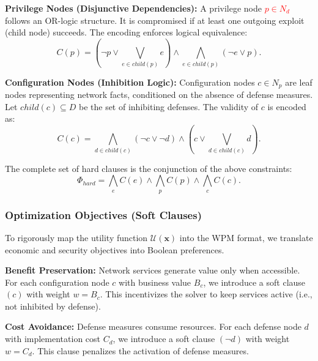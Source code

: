 \documentclass[conference]{IEEEtran}
\theoremstyle{definition} %
\theoremstyle{plain} %
\begin{document}
\textbf{Privilege Nodes (Disjunctive Dependencies):}
A privilege node \textcolor{red}{$p \in N_d$} follows an OR-logic structure. It is compromised if at least one outgoing exploit (child node) succeeds. The encoding enforces logical equivalence:
\begin{equation}
    \label{eq:hard_privilege}
    C(p) = \left( \neg p \vee \bigvee_{e \in child(p)} e \right) \wedge \bigwedge_{e \in child(p)} (\neg e \vee p).
\end{equation}

\textbf{Configuration Nodes (Inhibition Logic):}
    Configuration nodes $c \in N_p$ are leaf nodes representing network facts, conditioned on the absence of defense measures. Let $child(c) \subseteq D$ be the set of inhibiting defenses. The validity of $c$ is encoded as:
\begin{equation}
    \label{eq:hard_defense}
    C(c) = \bigwedge_{d \in child(c)} (\neg c \vee \neg d) \wedge \left( c \vee \bigvee_{d \in child(c)} d \right).
\end{equation}

The complete set of hard clauses is the conjunction of the above constraints:
\begin{equation}
    \Phi_{hard} = \bigwedge_{e} C(e) \wedge \bigwedge_{p} C(p) \wedge \bigwedge_{c} C(c).
\end{equation}

\subsubsection{Optimization Objectives (Soft Clauses)}
To rigorously map the utility function $\mathcal{U}(\mathbf{x})$ into the WPM format, we translate economic and security objectives into Boolean preferences.

\textbf{Benefit Preservation:}
Network services generate value only when accessible. For each configuration node $c$ with business value $B_c$, we introduce a soft clause $(c)$ with weight $w = B_c$. This incentivizes the solver to keep services active (i.e., not inhibited by defense).

\textbf{Cost Avoidance:}
Defense measures consume resources. For each defense node $d$ with implementation cost $C_d$, we introduce a soft clause $(\neg d)$ with weight $w = C_d$. This clause penalizes the activation of defense measures.
\end{document}
